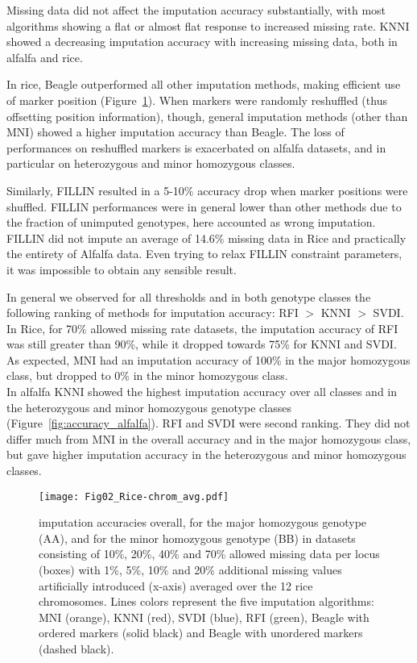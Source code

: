 Missing data did not affect the imputation accuracy substantially, with most algorithms showing a flat or almost flat response to increased missing rate. KNNI showed a decreasing imputation accuracy with increasing missing data, both in alfalfa and rice.

In rice, Beagle outperformed all other imputation methods, making efficient use of marker position (Figure~\ref{fig:accuracy_rice}). When markers were randomly reshuffled (thus offsetting position information), though, general imputation methods (other than MNI) showed a higher imputation accuracy than Beagle. The loss of performances on reshuffled markers is exacerbated on alfalfa datasets, and in particular on heterozygous and minor homozygous classes.  

Similarly, FILLIN resulted in a 5-10\% accuracy drop when marker positions were shuffled. FILLIN performances were in general lower than other methods due to the fraction of unimputed genotypes, here accounted as wrong imputation. FILLIN did not impute an average of 14.6\% missing data in Rice and practically the entirety of Alfalfa data. Even trying to relax FILLIN constraint parameters, it was impossible to obtain any sensible result.

In general we observed for all thresholds and in both genotype classes the following ranking of methods for imputation accuracy: RFI $>$ KNNI $>$ SVDI.
In Rice, for 70\% allowed missing rate datasets, the imputation accuracy of RFI was still greater than 90\%, while it dropped towards 75\% for KNNI and SVDI. As expected, MNI had an imputation accuracy of 100\% in the major homozygous class, but dropped to 0\% in the minor homozygous class.\\
In alfalfa KNNI showed the highest imputation accuracy over all classes and in the heterozygous and minor homozygous genotype classes (Figure~\ref{fig:accuracy_alfalfa}). RFI and SVDI were second ranking. They did not differ much from MNI in the overall accuracy and in the major homozygous class, but gave higher imputation accuracy in the heterozygous and minor homozygous classes. 


\begin{figure}
\texttt{[image: Fig02\_Rice-chrom\_avg.pdf]}
\caption[Rice imputation accuracies]{
imputation accuracies overall, for the major homozygous genotype (AA), and for the minor homozygous genotype (BB) in datasets consisting of 10\%, 20\%, 40\% and 70\% allowed missing data per locus (boxes) with 1\%, 5\%, 10\% and 20\% additional missing values artificially introduced (x-axis) averaged over the 12 rice chromosomes. Lines colors represent the five imputation algorithms: MNI (orange), KNNI (red), SVDI (blue), RFI (green), Beagle with ordered markers (solid black) and Beagle with unordered markers (dashed black).}
\label{fig:accuracy_rice}
\end{figure}

